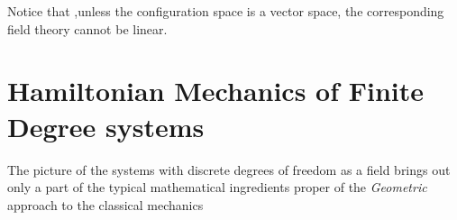\documentclass[Main]{subfiles}
\begin{document}
				Notice that ,unless the configuration space is a vector space, the corresponding field theory cannot be linear.
		
	\section{Hamiltonian Mechanics of Finite Degree systems}
		The picture of the systems with discrete degrees of freedom as a field brings out only a part of the typical mathematical ingredients proper of the \emph{Geometric} approach to the classical mechanics
\end{document}

